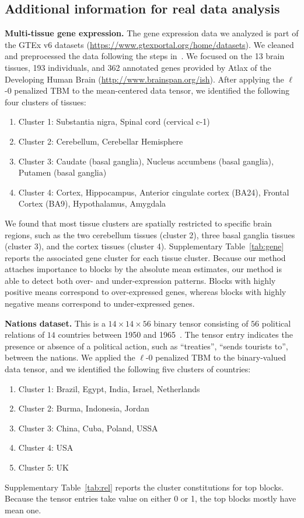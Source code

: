 \documentclass{article}
\begin{document}
\begin{appendices}
\section{Additional information for real data analysis}\label{sec:data}
{\bf Multi-tissue gene expression.} The gene expression data we analyzed is part of the GTEx v6 datasets (\url{https://www.gtexportal.org/home/datasets}). We cleaned and preprocessed the data following the steps in~\cite{wang2017three}. We focused on the 13 brain tissues, 193 individuals, and 362 annotated genes provided by Atlax of the Developing Human Brain (\url{http://www.brainspan.org/ish}). After applying the $\ell$-0 penalized TBM to the mean-centered data tensor, we identified the following four clusters of tissues:
\begin{enumerate}[label=-, leftmargin=*]
\item Cluster 1: Substantia nigra, Spinal cord (cervical c-1)
\item Cluster 2: Cerebellum, Cerebellar Hemisphere
\item Cluster 3: Caudate (basal ganglia), Nucleus accumbens (basal ganglia), Putamen (basal ganglia)
\item Cluster 4: Cortex, Hippocampus, Anterior cingulate cortex (BA24), Frontal Cortex (BA9), Hypothalamus, Amygdala
\end{enumerate}

We found that most tissue clusters are spatially restricted to specific brain regions, such as the two cerebellum tissues (cluster 2), three basal ganglia tissues (cluster 3), and the cortex tissues (cluster 4). Supplementary Table~\ref{tab:gene} reports the associated gene cluster for each tissue cluster. Because our method attaches importance to blocks by the absolute mean estimates, our method is able to detect both over- and under-expression patterns. Blocks with highly positive means correspond to over-expressed genes, whereas blocks with highly negative means correspond to under-expressed genes. 


{\bf Nations dataset.} This is a $14 \times 14 \times 56$ binary tensor consisting of $56$ political relations of $14$ countries between 1950 and 1965~\cite{nickel2011three}. The tensor entry indicates the presence or absence of a political action, such as ``treaties'', ``sends tourists to'', between the nations. We applied the $\ell$-0 penalized TBM to the binary-valued data tensor, and we identified the following five clusters of countries:
\begin{enumerate}[label=-, leftmargin=*]
\item Cluster 1: Brazil, Egypt, India, Israel, Netherlands
\item Cluster 2: Burma, Indonesia, Jordan
\item Cluster 3: China, Cuba, Poland, USSA
\item Cluster 4: USA
\item Cluster 5: UK
\end{enumerate}
Supplementary Table~\ref{tab:rel} reports the cluster constitutions for top blocks. Because the tensor entries take value on either 0 or 1, the top blocks mostly have mean one. 


\end{appendices}


\end{document}
